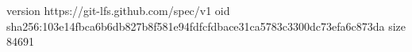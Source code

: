version https://git-lfs.github.com/spec/v1
oid sha256:103e14fbca6b6db827b8f581e94fdfcfdbace31ca5783c3300dc73efa6c873da
size 84691
